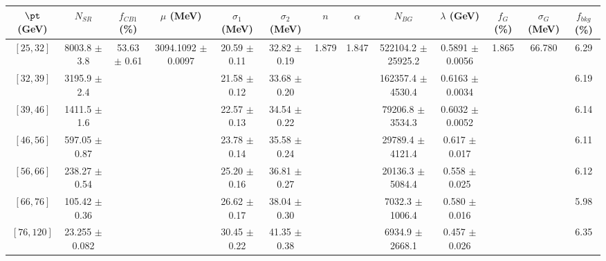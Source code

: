 \begin{tabular}{c||c|c|c|c|c|c|c|c|c|c|c||c}
$\pt$ (GeV) & $N_{SR}$ & $f_{CB1}$ (\%) & $\mu$ (MeV) & $\sigma_1$ (MeV) & $\sigma_2$ (MeV) & $n$ & $\alpha$ & $N_{BG}$ & $\lambda$ (GeV) & $f_G$ (\%) & $\sigma_G$ (MeV) & $f_{bkg}$ (\%) \\
\hline
$[25, 32]$ & 8003.8 $\pm$ 3.8 & \multirow{7}{*}{53.63 $\pm$ 0.61} & \multirow{7}{*}{3094.1092 $\pm$ 0.0097} & 20.59 $\pm$ 0.11 & 32.82 $\pm$ 0.19 & \multirow{7}{*}{1.879} & \multirow{7}{*}{1.847} & 522104.2 $\pm$ 25925.2 & 0.5891 $\pm$ 0.0056 & \multirow{7}{*}{1.865} & \multirow{7}{*}{66.780} & 6.29\\
$[32, 39]$ & 3195.9 $\pm$ 2.4 &  &  & 21.58 $\pm$ 0.12 & 33.68 $\pm$ 0.20 &  &  & 162357.4 $\pm$ 4530.4 & 0.6163 $\pm$ 0.0034 &  &  & 6.19\\
$[39, 46]$ & 1411.5 $\pm$ 1.6 &  &  & 22.57 $\pm$ 0.13 & 34.54 $\pm$ 0.22 &  &  & 79206.8 $\pm$ 3534.3 & 0.6032 $\pm$ 0.0052 &  &  & 6.14\\
$[46, 56]$ & 597.05 $\pm$ 0.87 &  &  & 23.78 $\pm$ 0.14 & 35.58 $\pm$ 0.24 &  &  & 29789.4 $\pm$ 4121.4 & 0.617 $\pm$ 0.017 &  &  & 6.11\\
$[56, 66]$ & 238.27 $\pm$ 0.54 &  &  & 25.20 $\pm$ 0.16 & 36.81 $\pm$ 0.27 &  &  & 20136.3 $\pm$ 5084.4 & 0.558 $\pm$ 0.025 &  &  & 6.12\\
$[66, 76]$ & 105.42 $\pm$ 0.36 &  &  & 26.62 $\pm$ 0.17 & 38.04 $\pm$ 0.30 &  &  & 7032.3 $\pm$ 1006.4 & 0.580 $\pm$ 0.016 &  &  & 5.98\\
$[76, 120]$ & 23.255 $\pm$ 0.082 &  &  & 30.45 $\pm$ 0.22 & 41.35 $\pm$ 0.38 &  &  & 6934.9 $\pm$ 2668.1 & 0.457 $\pm$ 0.026 &  &  & 6.35\\
\end{tabular}
